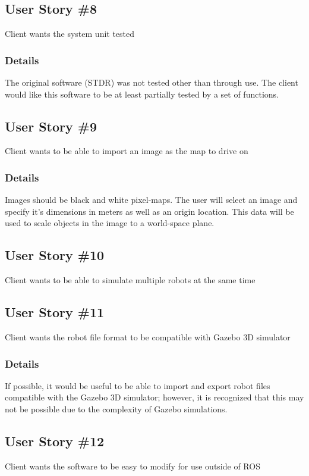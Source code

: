 \subsection{User Story \#8} 
Client wants the system unit tested

\subsubsection{Details}
The original software (STDR) was not tested other than through use. The client would like this software to be at least partially tested by a set of functions.

\subsection{User Story \#9} 
Client wants to be able to import an image as the map to drive on

\subsubsection{Details}
Images should be black and white pixel-maps. The user will select an image and specify it's dimensions in meters as well as an origin location. This data will be used to scale objects in the image to a world-space plane.

\subsection{User Story \#10} 
Client wants to be able to simulate multiple robots at the same time

\subsection{User Story \#11} 
Client wants the robot file format to be compatible with Gazebo 3D simulator

\subsubsection{Details}
If possible, it would be useful to be able to import and export robot files compatible with the Gazebo 3D simulator; however, it is recognized that this may not be possible due to the complexity of Gazebo simulations.

\subsection{User Story \#12} 
Client wants the software to be easy to modify for use outside of ROS

